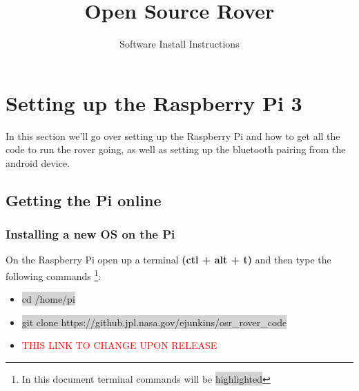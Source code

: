 \documentclass[12pt]{article}
\begin{document}
\title{Open Source Rover}
\author{Software Install Instructions}

\makeatletter         
\def\@maketitle{
\begin{center}	
	\makebox[\textwidth][c]{ \texttt{[image: "Pictures/software title".png]}}
	{\Huge \bfseries \sffamily \@title }\\[4ex] 
	{\huge \bfseries \sffamily \@author}\\[4ex] 
	\texttt{[image: "Pictures/JPL logo".png]}
\end{center}}
\makeatother

\maketitle

\newpage


\tableofcontents

\newpage


\section{Setting up the Raspberry Pi 3}
In this section we'll go over setting up the Raspberry Pi and how to get all the code to run the rover going, as well as setting up the bluetooth pairing from the android device.
\subsection{Getting the Pi online}

\subsubsection{Installing a new OS on the Pi}

On the Raspberry Pi open up a terminal \textbf{(ctl + alt + t)} and then type the following commands \footnote{In this document terminal commands will be \colorbox{lightgray}{highlighted}}:

\begin{itemize}
	\item[] \colorbox{lightgray}{cd /home/pi}
	\item[] \colorbox{lightgray}{git clone https://github.jpl.nasa.gov/ejunkins/osr\_rover\_code}
	\item[] \textcolor{red}{THIS LINK TO CHANGE UPON RELEASE}
\end{itemize}
\end{document}
